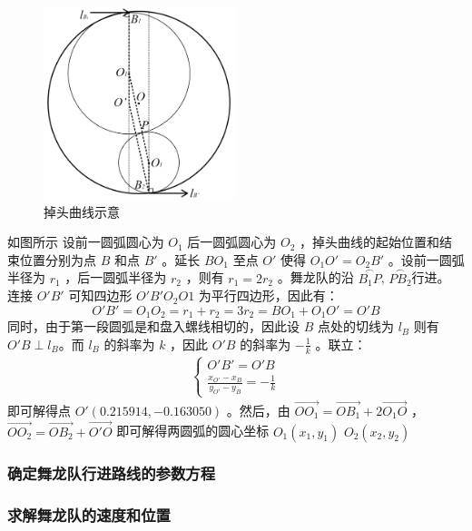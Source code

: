 \documentclass[a4paper]{article}
\begin{document}
	\begin{figure}[h]
		\centering
		\includegraphics[width=0.5\textwidth]{image/Figure_5411.png}
		\caption{掉头曲线示意}
		\label{Figure_5411}
	\end{figure}
	
	如图所示 %
	设前一圆弧圆心为 $O_1$ 后一圆弧圆心为 $O_2$ ，掉头曲线的起始位置和结束位置分别为点 $B$ 和点 $B'$ 。延长 $B O_1$ 至点 $O'$ 使得 $O_1O' = O_2B'$ 。设前一圆弧半径为 $r_1$ ，后一圆弧半径为 $r_2$ ，则有 $r_1 = 2r_2$ 。舞龙队的沿 $\overset{\frown}{B_1 P}$, $\overset{\frown}{PB_2}$行进。 连接 $O'B'$ 可知四边形 $O'B'O_2O1$ 为平行四边形，因此有： 
	$$ O'B'= O_1O_2 = r_1 + r_2 = 3r_2 = BO_1 + O_1O' = O'B$$
	同时，由于第一段圆弧是和盘入螺线相切的，因此设 $B$ 点处的切线为 $l_B$ 则有 $O'B \perp l_B$。而 $l_B$ 的斜率为 $k$ ，因此 $O'B$ 的斜率为 $-\frac{1}{k}$ 。联立：
	\begin{align}
		\left\{
		\begin{aligned}
			O'B'=O'B \\
			\frac{x_{O'} - x_B}{y_{O'} - y_B} = -\frac{1}{k}
		\end{aligned}
		\right.
	\end{align}
	即可解得点 $O'(0.215914, -0.163050)$ 。然后，由 $\overrightarrow{OO_1} = \overrightarrow{OB_1} + 2\overrightarrow{O_1O}$ ， $\overrightarrow{OO_2} = \overrightarrow{OB_2} + \overrightarrow{O'O}$ 即可解得两圆弧的圆心坐标 $O_1(x_1, y_1)$ $O_2(x_2, y_2)$
	
	\subsubsection{确定舞龙队行进路线的参数方程}
	
	\subsubsection{求解舞龙队的速度和位置}
	
\end{document}
